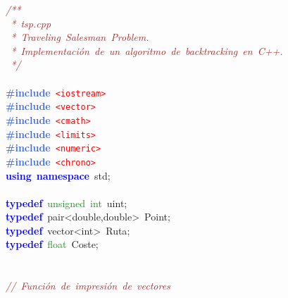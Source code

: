 \noindent
\mbox{}\textit{\textcolor{Brown}{/**}} \\
\mbox{}\textit{\textcolor{Brown}{\ *\ tsp.cpp}} \\
\mbox{}\textit{\textcolor{Brown}{\ *\ Traveling\ Salesman\ Problem.}} \\
\mbox{}\textit{\textcolor{Brown}{\ *\ Implementación\ de\ un\ algoritmo\ de\ backtracking\ en\ C++.}} \\
\mbox{}\textit{\textcolor{Brown}{\ */}} \\
\mbox{} \\
\mbox{}\textbf{\textcolor{RoyalBlue}{\#include}}\ \texttt{\textcolor{Red}{\textless{}iostream\textgreater{}}} \\
\mbox{}\textbf{\textcolor{RoyalBlue}{\#include}}\ \texttt{\textcolor{Red}{\textless{}vector\textgreater{}}} \\
\mbox{}\textbf{\textcolor{RoyalBlue}{\#include}}\ \texttt{\textcolor{Red}{\textless{}cmath\textgreater{}}} \\
\mbox{}\textbf{\textcolor{RoyalBlue}{\#include}}\ \texttt{\textcolor{Red}{\textless{}limits\textgreater{}}} \\
\mbox{}\textbf{\textcolor{RoyalBlue}{\#include}}\ \texttt{\textcolor{Red}{\textless{}numeric\textgreater{}}} \\
\mbox{}\textbf{\textcolor{RoyalBlue}{\#include}}\ \texttt{\textcolor{Red}{\textless{}chrono\textgreater{}}} \\
\mbox{}\textbf{\textcolor{Blue}{using}}\ \textbf{\textcolor{Blue}{namespace}}\ std\textcolor{BrickRed}{;} \\
\mbox{} \\
\mbox{}\textbf{\textcolor{Blue}{typedef}}\ \textcolor{ForestGreen}{unsigned}\ \textcolor{ForestGreen}{int}\ uint\textcolor{BrickRed}{;} \\
\mbox{}\textbf{\textcolor{Blue}{typedef}}\ \textcolor{TealBlue}{pair\textless{}double,double\textgreater{}}\ Point\textcolor{BrickRed}{;} \\
\mbox{}\textbf{\textcolor{Blue}{typedef}}\ \textcolor{TealBlue}{vector\textless{}int\textgreater{}}\ Ruta\textcolor{BrickRed}{;} \\
\mbox{}\textbf{\textcolor{Blue}{typedef}}\ \textcolor{ForestGreen}{float}\ Coste\textcolor{BrickRed}{;} \\
\mbox{} \\
\mbox{} \\
\mbox{}\textit{\textcolor{Brown}{//\ Función\ de\ impresión\ de\ vectores}} \\
